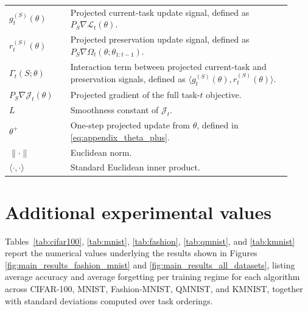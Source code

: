 \documentclass{article}
\begin{document}
\begin{table}[!h]
\begin{tabular}{p{0.20\linewidth} p{0.72\linewidth}}
$g_t^{(S)}(\theta)$ & Projected current-task update signal, defined as $P_S \nabla \mathcal{L}_t(\theta)$. \\

$r_t^{(S)}(\theta)$ & Projected preservation update signal, defined as $P_S \nabla \Omega_t(\theta;\theta_{1:t-1})$. \\

$\Gamma_t(S;\theta)$ & Interaction term between projected current-task and preservation signals, defined as $\langle g_t^{(S)}(\theta), r_t^{(S)}(\theta)\rangle$. \\

$P_S \nabla \mathcal{J}_t(\theta)$ & Projected gradient of the full task-$t$ objective. \\

$L$ & Smoothness constant of $\mathcal{J}_t$. \\

$\theta^+$ & One-step projected update from $\theta$, defined in \ref{eq:appendix_theta_plus}. \\

$\|\cdot\|$ & Euclidean norm. \\

$\langle \cdot,\cdot \rangle$ & Standard Euclidean inner product. \\
\bottomrule
\end{tabular}
\label{tab:notation}
\end{table}

\section{Additional experimental values}

Tables~\ref{tab:cifar100}, \ref{tab:mnist}, \ref{tab:fashion}, \ref{tab:qmnist}, and \ref{tab:kmnist} report the numerical values underlying the results shown in Figures \ref{fig:main_results_fashion_mnist} and \ref{fig:main_results_all_datasets}, listing average accuracy and average forgetting per training regime for each algorithm across CIFAR-100, MNIST, Fashion-MNIST, QMNIST, and KMNIST, together with standard deviations computed over task orderings.
\end{document}
